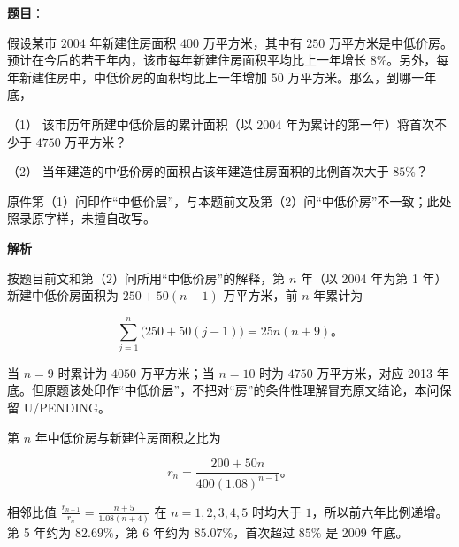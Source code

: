 \begin{answer}

\textbf{题目}：

假设某市 $2004$ 年新建住房面积 $400$ 万平方米，其中有 $250$ 万平方米是中低价房。预计在今后的若干年内，该市每年新建住房面积平均比上一年增长 $8\%$。另外，每年新建住房中，中低价房的面积均比上一年增加 $50$ 万平方米。那么，到哪一年底，

（1） 该市历年所建中低价层的累计面积（以 $2004$ 年为累计的第一年）将首次不少于 $4750$ 万平方米？

（2） 当年建造的中低价房的面积占该年建造住房面积的比例首次大于 $85\%$？

\begin{gktip}
原件第（1）问印作“中低价层”，与本题前文及第（2）问“中低价房”不一致；此处照录原字样，未擅自改写。
\end{gktip}

\textbf{解析}


按题目前文和第（2）问所用“中低价房”的解释，第 $n$ 年（以 2004 年为第 1 年）新建中低价房面积为 $250+50(n-1)$ 万平方米，前 $n$ 年累计为

\nopagebreak[4]
\[
\sum_{j=1}^{n}\bigl(250+50(j-1)\bigr)=25n(n+9)\mbox{。}
\]

当 $n=9$ 时累计为 $4050$ 万平方米；当 $n=10$ 时为 $4750$ 万平方米，对应 2013 年底。但原题该处印作“中低价层”，不把对“房”的条件性理解冒充原文结论，本问保留 U/PENDING。


第 $n$ 年中低价房与新建住房面积之比为

\nopagebreak[4]
\[
r_n=\frac{200+50n}{400(1.08)^{n-1}}\mbox{。}
\]

相邻比值 $\frac{r_{n+1}}{r_n}=\frac{n+5}{1.08(n+4)}$ 在 $n=1,2,3,4,5$ 时均大于 $1$，所以前六年比例递增。第 5 年约为 $82.69\%$，第 6 年约为 $85.07\%$，首次超过 $85\%$ 是 2009 年底。



\end{answer}
